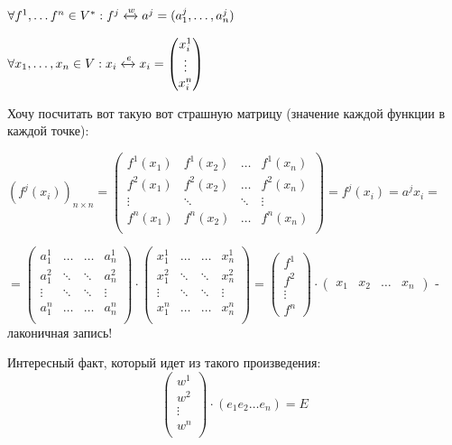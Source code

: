 $\forall f^1, \ldots f^n \in V^*: f^j \xleftrightarrow{w} a^j = (a_1^j,\ldots , a_n^j)$

$\forall x_1, \ldots, x_n \in V: x_i \xleftrightarrow{e}x_i = \begin{pmatrix}
    x^1_i \\
    \vdots \\
    x^n_i
\end{pmatrix}$

Хочу посчитать вот такую вот страшную матрицу (значение каждой функции в каждой точке):

$(f^j(x_i))_{n\times n} = \begin{pmatrix}
    f^1(x_1) & f^1(x_2) & \dots & f^1(x_n)\\
    f^2(x_1) & f^2(x_2) & \dots & f^2(x_n)\\
    \vdots & \ddots & \ddots & \vdots \\
    f^n(x_1) & f^n(x_2) & \dots & f^n(x_n)\\
\end{pmatrix} = f^j(x_i)= a^j x_i  = $


$=\begin{pmatrix}
    a_1^1 & \ldots & \ldots& a^1_n\\
     a_1^2 & \ddots & \ddots& a^2_n\\
      \vdots & \ddots & \ddots& \vdots\\
      a_1^n & \ldots & \ldots& a^n_n\\
\end{pmatrix} \cdot\begin{pmatrix}
    x_1^1 & \ldots & \ldots& x^1_n\\
     x_1^2 & \ddots & \ddots& x^2_n\\
      \vdots & \ddots & \ddots& \vdots\\
      x_1^n & \ldots & \ldots& x^n_n\\
\end{pmatrix} = \begin{pmatrix}
    f^1\\
    f^2\\
    \vdots\\
    f^n
\end{pmatrix} \cdot \begin{pmatrix}
    x_1 & x_2 & \ldots & x_n
\end{pmatrix}$ - лаконичная запись!



Интересный факт, который идет из такого произведения:
$$\begin{pmatrix}
    w^1 \\
    w^2 \\
    \vdots \\
    w^n \\
\end{pmatrix} \cdot (e_1e_2 \dots e_n) = E $$

